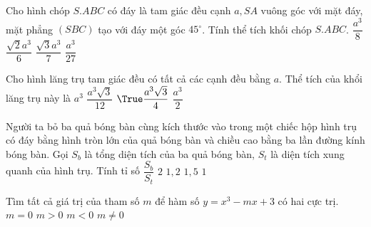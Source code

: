 \begin{ex}%
Cho hình chóp $S.ABC$ có đáy là tam giác đều cạnh $a, SA$ vuông góc với mặt đáy, mặt phẳng $(SBC)$ tạo với đáy một góc $45^{\circ}$. Tính thể tích khối chóp $S.ABC$.
\choice 
{\True $\dfrac{a^3}{8}$}
{$\dfrac{\sqrt{2}a^3}{6}$}
{$\dfrac{\sqrt{3}a^3}{7}$}
{$\dfrac{a^3}{27}$}
\end{ex}
\begin{ex}%
Cho hình lăng trụ tam giác đều có tất cả các cạnh đều bằng $a$. Thể tích của khổi lăng trụ này là
\choice 
{$a^3$}
{$\dfrac{a^3\sqrt{3}}{12}$}
{$\True \dfrac{a^3\sqrt{3}}{4}$}
{$\dfrac{a^3}{2}$}
\end{ex}
\begin{ex}%
Người ta bỏ ba quả bóng bàn cùng kích thước vào trong một chiếc hộp hình trụ có đáy bằng hình tròn lớn của quả bóng bàn và chiều cao bằng ba lần đường kính bóng bàn. Gọi $S_b$ là tổng diện tích của ba quả bóng bàn, $S_t$ là diện tích xung quanh của hình trụ. Tính tỉ số $\dfrac{S_b}{S_t}$
\choice 
{$2$}
{$1,2$}
{$1,5$}
{\True $1$}
\end{ex}
\begin{ex}%
Tìm tất cả giá trị của tham số $m$ để hàm số $y=x^3-mx+3$ có hai cực trị.
\choice 
{$m=0$}
{\True $m>0$}
{$m<0$}
{$m\neq 0$}
\end{ex}
